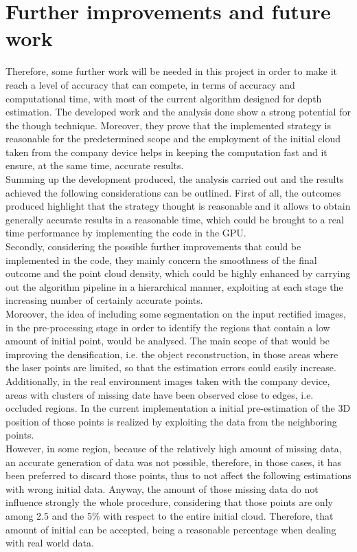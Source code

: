 \section{Further improvements and future work}
\label{section:further-improvements}

Therefore, some further work will be needed in this project in order to make it reach a level of accuracy that can compete, in terms of accuracy and computational time, with most of the current algorithm designed for depth estimation.
The developed work and the analysis done show a strong potential for the though technique.
Moreover, they prove that the implemented strategy is reasonable for the predetermined scope and the employment of the initial cloud taken from the company device helps in keeping the computation fast and it ensure, at the same time, accurate results.\\
Summing up the development produced, the analysis carried out and the results achieved the following considerations can be outlined.
First of all, the outcomes produced highlight that the strategy thought is reasonable and it allows to obtain generally accurate results in a reasonable time, which could be brought to a real time performance by implementing the code in the GPU. \\
Secondly, considering the possible further improvements that could be implemented in the code, they mainly concern the smoothness of the final outcome and the point cloud density, which could be highly enhanced by carrying out the algorithm pipeline in a hierarchical manner, exploiting at each stage the increasing number of certainly accurate points. \\
Moreover, the idea of including some segmentation on the input rectified images, in the pre-processing stage in order to identify the regions that contain a low amount of initial point, would be analysed.
The main scope of that would be improving the densification, i.e. the object reconstruction, in those areas where the laser points are limited, so that the estimation errors could easily increase. 
Additionally, in the real environment images taken with the company device, areas with clusters of missing date have been observed close to edges, i.e. occluded regions. 
In the current implementation a initial pre-estimation of the 3D position of those points is realized by exploiting the data from the neighboring points. \\
However, in some region, because of the relatively high amount of missing data, an accurate generation of data was not possible, therefore, in those cases, it has been preferred to discard those points, thus to not affect the following estimations with wrong initial data.
Anyway, the amount of those missing data do not influence strongly the whole procedure, considering that those points are only among 2.5 and the 5\% with respect to the entire initial cloud. 
Therefore, that amount of initial can be accepted, being a reasonable percentage when dealing with real world data. 


